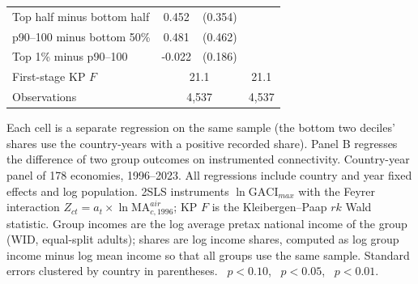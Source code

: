 \begin{table}[p]
\begin{threeparttable}
\begin{tabular}{lcccc}
Top half minus bottom half & 0.452 & (0.354) & & \\
p90--100 minus bottom 50\% & 0.481 & (0.462) & & \\
Top 1\% minus p90--100 & -0.022 & (0.186) & & \\
\midrule
First-stage KP $F$ & \multicolumn{2}{c}{21.1} & \multicolumn{2}{c}{21.1} \\
Observations & \multicolumn{2}{c}{4{,}537} & \multicolumn{2}{c}{4{,}537} \\
\bottomrule
\end{tabular}
\begin{tablenotes}\small
\item Each cell is a separate regression on the same sample (the bottom two deciles' shares use the country-years with a positive recorded share). Panel B regresses the difference of two group outcomes on instrumented connectivity. Country-year panel of 178 economies, 1996--2023. All regressions include country and year fixed effects and log population. 2SLS instruments $\ln\mathrm{GACI}_{max}$ with the Feyrer interaction $Z_{ct}=a_t\times\ln\mathrm{MA}^{air}_{c,1996}$; KP $F$ is the Kleibergen--Paap $rk$ Wald statistic. Group incomes are the log average pretax national income of the group (WID, equal-split adults); shares are log income shares, computed as log group income minus log mean income so that all groups use the same sample. Standard errors clustered by country in parentheses. \sym{*}~$p<0.10$, \sym{**}~$p<0.05$, \sym{***}~$p<0.01$.
\end{tablenotes}
\end{threeparttable}
\end{table}
